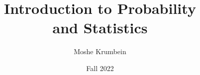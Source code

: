 
\usepackage{subfiles}

\title{Introduction to Probability \\ and Statistics}
\def \thecoursenum {80430}
\def \theinstructor {Ohad Feldheim}
\author{Moshe Krumbein}
\date{Fall 2022}





\setcounter{tocdepth}{2}
\tableofcontents
\cleardoublepage




